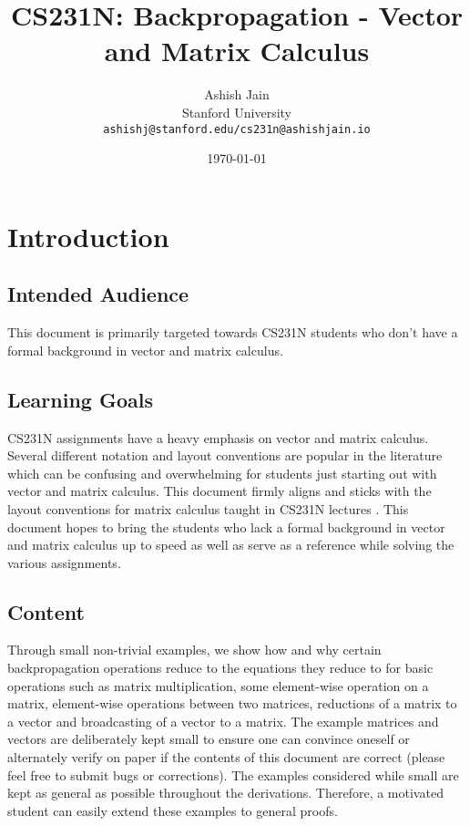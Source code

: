 \documentclass{article}
\title{CS231N: Backpropagation - Vector and Matrix Calculus}
\author{
  Ashish Jain \\
  Stanford University \\
  \texttt{ashishj@stanford.edu/cs231n@ashishjain.io}
 }
\date{\today}
\begin{document}
\pagestyle{empty}
\maketitle

\tableofcontents

\newpage
\pagestyle{fancy}
\section{Introduction}
\subsection{Intended Audience}
This document is primarily targeted towards CS231N students who don't have a formal background in vector and matrix calculus.

\subsection{Learning Goals}
CS231N assignments have a heavy emphasis on vector and matrix calculus. Several different notation and layout conventions are popular in the literature which can be confusing and overwhelming for students just starting out with vector and matrix calculus. This document firmly aligns and sticks with the layout conventions for matrix calculus taught in CS231N lectures \cite{li_krishna_xu_2021}. This document hopes to bring the students who lack a formal background in vector and matrix calculus up to speed as well as serve as a reference while solving the various assignments. 

\subsection{Content}
Through small non-trivial examples, we show how and why certain backpropagation operations reduce to the equations they reduce to for basic operations such as matrix multiplication, some element-wise operation on a matrix, element-wise operations between two matrices, reductions of a matrix to a vector and broadcasting of a vector to a matrix. The example matrices and vectors are deliberately kept small to ensure one can convince oneself or alternately verify on paper if the contents of this document are correct (please feel free to submit bugs or corrections). The examples considered while small are kept as general as possible throughout the derivations. Therefore, a motivated student can easily extend these examples to general proofs.
\end{document}
